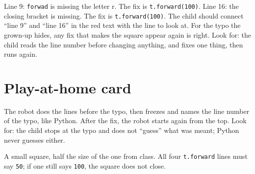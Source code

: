 \begin{answer}
Line 9: \texttt{forwad} is missing the letter r. The fix is \texttt{t.forward(100)}.
Line 16: the closing bracket is missing. The fix is \texttt{t.forward(100)}.
The child should connect \enquote{line 9} and \enquote{line 16} in the red text with the line to look at. For the typo the grown-up hides, any fix that makes the square appear again is right. Look for: the child reads the line number before changing anything, and fixes one thing, then runs again.
\end{answer}

\section{Play-at-home card}
\begin{answer}
The robot does the lines before the typo, then freezes and names the line number of the typo, like Python. After the fix, the robot starts again from the top. Look for: the child stops at the typo and does not \enquote{guess} what was meant; Python never guesses either.
\end{answer}

\begin{answer}
A small square, half the size of the one from class. All four \texttt{t.forward} lines must say \texttt{50}; if one still says \texttt{100}, the square does not close.
\end{answer}
